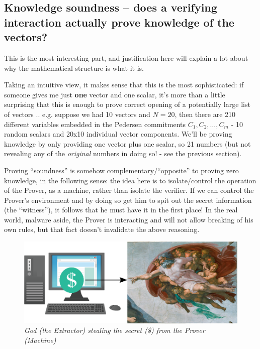\documentclass[10pt,a4paper]{article}
\begin{document}
\hypertarget{knowledge-soundness-does-a-verifying-interaction-actually-prove-knowledge-of-the-vectors}{%
\subsection[Knowledge soundness -- does a verifying interaction actually
prove knowledge of the
vectors?]{\texorpdfstring{\protect\hypertarget{anchor-29}{}{}Knowledge
soundness -- does a verifying interaction actually prove knowledge of
the
vectors?}{Knowledge soundness -- does a verifying interaction actually prove knowledge of the vectors?}}\label{knowledge-soundness-does-a-verifying-interaction-actually-prove-knowledge-of-the-vectors}}

This is the most interesting part, and justification here will explain a
lot about why the mathematical structure is what it is.

Taking an intuitive view, it makes sense that this is the most
sophisticated: if someone gives me just \textbf{one }vector and one
scalar, it's more than a little surprising that this is enough to prove
correct opening of a potentially large list of vectors .. e.g. suppose
we had 10 vectors and $N = 20$, then there are 210 different variables
embedded in the Pedersen commitments $C_1, C_2, \ldots ,C_m$ - 10 random scalars and 20x10
individual vector components. We'll be proving knowledge by only
providing one vector plus one scalar, so 21 numbers (but not revealing
any of the \emph{original} numbers in doing so! - see the previous
section).

Proving ``soundness'' is somehow complementary/``opposite'' to proving
zero knowledge, in the following sense: the idea here is to
isolate/control the operation of the Prover, as a machine, rather than
isolate the verifier. If we can control the Prover's environment and by
doing so get him to spit out the secret information (the ``witness''),
it follows that he must have it in the first place! In the real world,
malware aside, the Prover is interacting and will not allow breaking of
his own rules, but that fact doesn't invalidate the above reasoning.

\begin{figure}[h]
\centering
\includegraphics[scale=0.50]{images/extractorgod5.png}
\caption{\emph{God (the Extractor) stealing the secret (\$) from the Prover (Machine)}}
\end{figure}
\end{document}
